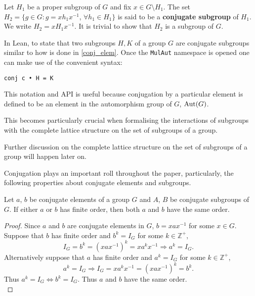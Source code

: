 \begin{definition}
Let $H_1$ be a proper subgroup of $G$ and fix $x \in G \setminus H_1$. The set $H_2 = \{g \in G : g= xh_1x^{-1}$, $\forall h_1 \in H_1\}$ is said to be a \textbf{conjugate subgroup} of $H_1$. We write $H_2 = xH_1x^{-1}$. It is trivial to show that $H_2$ is a subgroup of $G$.
\end{definition}

\begin{remark}
In Lean, to state that two subgroups $H, K$ of a group $G$ are conjugate subgroups similar to how is done 
in \ref{conj_elem}. Once the \texttt{MulAut} namespace is opened one can make use of the convenient syntax:

\begin{verbatim}
conj c • H = K 
\end{verbatim}

This notation and API is useful because conjugation by a particular element is defined to be an element in the automorphism group of $G$, $\operatorname{Aut}(G)$. 

This becomes particularly crucial when formalising the interactions of subgroups with the complete lattice structure on the set of subgroups of a group. 

Further discussion on the complete lattice structure on the set of subgroups of a group will happen later on.
\end{remark}

Conjugation plays an important roll throughout the paper, 
particularly, the following properties about conjugate elements and subgroups.

\begin{proposition}
    \label{orderOf_injective}
Let $a$, $b$ be conjugate elements of a group $G$ and $A$, $B$ be conjugate subgroups of $G$.
If either $a$ or $b$ has finite order, then both $a$ and $b$ have the same order.
\end{proposition}

\begin{proof}
    Since $a$ and $b$ are conjugate elements in $G$, $b = xax^{-1}$ for some $x \in G$. Suppose that $b$ has finite order and $b^k = I_G$ for some $k \in \mathbb{Z}^+$,
    \begin{equation*} 
        I_G = b^k = (xax^{-1})^k = xa^{k}x^{-1} \Rightarrow a^k = I_G.
    \end{equation*}
    Alternatively suppose that $a$ has finite order and $a^k = I_G$ for some $k \in \mathbb{Z}^+$,
    \begin{equation*} 
        a^k = I_G \Rightarrow I_G = xa^{k}x^{-1} = (xax^{-1})^k = b^k.
    \end{equation*}
    Thus $a^k = I_G \iff b^k = I_G$. Thus $a$ and $b$ have the same order. \\
\end{proof}

